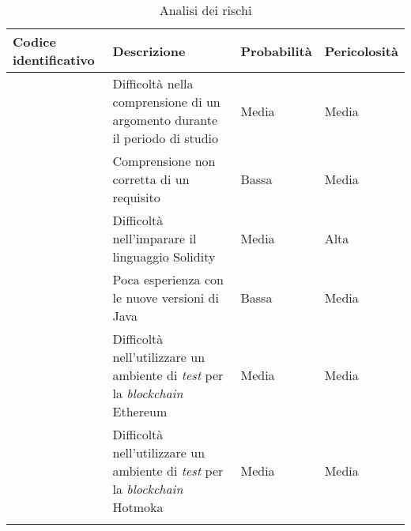 \begin{longtabu}{|X[1,c]|X[2,c]|X[0.8,c,m]|X[0.8,c,m]|}

  \hline

  \textbf{Codice identificativo} & \textbf{Descrizione} & \textbf{Probabilità} & \textbf{Pericolosità} \\

  \hline

   & Difficoltà nella comprensione di un argomento durante il periodo di studio & Media & Media \\

  \hline

   & Comprensione non corretta di un requisito & Bassa & Media \\

  \hline

   & Difficoltà nell'imparare il linguaggio Solidity & Media & Alta \\

  \hline

   & Poca esperienza con le nuove versioni di Java & Bassa & Media \\

  \hline

   & Difficoltà nell'utilizzare un ambiente di \textit{test} per la \textit{blockchain} Ethereum & Media & Media \\

  \hline

   & Difficoltà nell'utilizzare un ambiente di \textit{test} per la \textit{blockchain} Hotmoka & Media & Media \\

  \hline

  \caption{Analisi dei rischi}
\end{longtabu}
